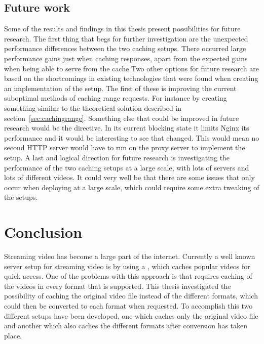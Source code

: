\documentclass[twoside,openright]{uva-bachelor-thesis}
\begin{document}
\section{Future work}
Some of the results and findings in this thesis present possibilities for future
research. The first thing that begs for further investigation are the unexpected
performance differences between the two caching \lt setups. There occurred large
performance gains just when caching responses, apart from the expected gains
when being able to serve from the cache
Two other options for future research are based on the
shortcomings in existing technologies that were found when creating an
implementation of the \lt setup. The first of these is improving the current
suboptimal methods of caching range requests. For instance by creating something
similar to the theoretical solution described in section~\ref{sec:cachingrange}.
Something else that could be improved in future research would be the \ipplong
directive. In its current blocking state it limits Nginx its performance and it
would be interesting to see that changed. This would mean no second HTTP server
would have to run on the proxy server to implement the \lt setup. A last and
logical direction for future research is investigating the performance of the
two caching \lt setups at a large scale, with lots of servers and lots of
different videos. It could very well be that there are some issues that only
occur when deploying at a large scale, which could require some extra tweaking
of the setups.





\chapter{Conclusion}
Streaming video has become a large part of the internet. Currently a well
known server setup for streaming video is by using a \cdn, which caches popular
videos for quick access. One of the problems with this approach is that requires
caching of the videos in every format that is supported. This thesis
investigated the possibility of caching the original video file instead of the
different formats, which could then be converted to each format when
requested.  To accomplish this two different setups have been developed, one
which caches only the original video file and another which also caches the
different formats after conversion has taken place.
\end{document}
